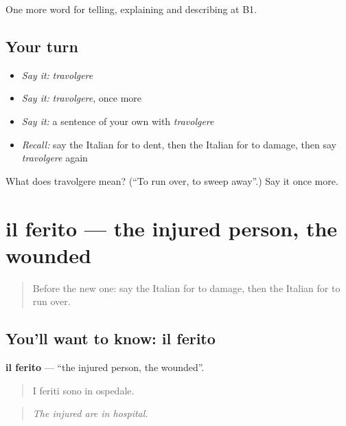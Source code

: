 \begin{grammarlens}[title={What you've built}]
One more word for telling, explaining and describing at B1.
\end{grammarlens}

\subsection*{Your turn}
\begin{itemize}
\raggedright
  \item \emph{Say it:} \emph{travolgere}
  \item \emph{Say it:} \emph{travolgere}, once more
  \item \emph{Say it:} a sentence of your own with \emph{travolgere}
  \item \emph{Recall:} say the Italian for to dent, then the Italian for to damage, then say \emph{travolgere} again
\end{itemize}

\begin{tcolorbox}[breakable,colback=teal!4,colframe=teal!35!black,title={Before you move on}]
What does travolgere mean? (\textquotedblleft{}To run over, to sweep away\textquotedblright{}.) Say it once more.
\end{tcolorbox}
\section[il ferito]{il ferito — the injured person, the wounded}

\label{lesson:IT-C300-ferito}



\begin{quote}
Before the new one: say the Italian for to damage, then the Italian for to run over.
\end{quote}

\subsection*{You'll want to know: il ferito}
\textbf{il ferito} — \textquotedblleft{}the injured person, the wounded\textquotedblright{}.

\begin{quote}
I feriti sono in ospedale.
\end{quote}

\begin{quote}
\emph{The injured are in hospital.}
\end{quote}

